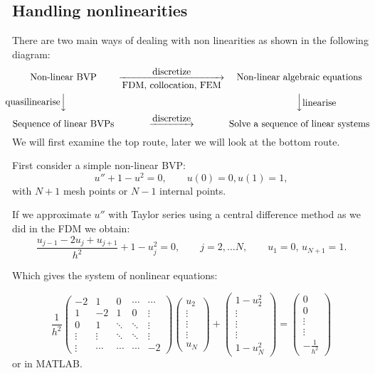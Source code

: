 \documentclass[12pt, a4paper]{article}
\theoremstyle{definition}
\theoremstyle{remark}
\numberwithin{equation}{section}
\begin{document}
\subsection{Handling nonlinearities}
There are two main ways of dealing with non linearities as shown in the following diagram:
\begin{equation*}
\begin{CD}
\mbox{Non-linear BVP} @>\mbox{discretize}>\mbox{FDM, collocation, FEM}> \mbox{Non-linear algebraic equations}\\
@V\mbox{quasilinearise}VV @VV\mbox{linearise}V\\
\mbox{Sequence of linear BVPs} @>\mbox{discretize}>> \mbox{Solve a sequence of linear systems}
\end{CD}
\end{equation*}
We will first examine the top route, later we will look at the bottom route.

First consider a simple non-linear BVP:
\begin{equation*}
u''+1-u^2=0, \qquad u(0)=0, u(1)=1,
\end{equation*}
with $N+1$ mesh points or $N-1$ internal points.

If we approximate $u''$ with Taylor series using a central difference method as we did in the FDM we obtain:
\begin{equation*}
\frac{u_{j-1}-2u_j+u_{j+1}}{h^2} +1-u^2_j=0, \qquad j=2,\dots N, \qquad u_1=0,\,u_{N+1}=1.
\end{equation*}

Which gives the system of nonlinear equations:

\begin{equation*}
\frac{1}{h^2} 
\begin{pmatrix}
-2 & 1 & 0 & \cdots & \cdots \\
1 & -2 & 1 & 0 & \vdots \\
0 & 1& \ddots & \ddots & \vdots\\
\vdots & \vdots & \ddots & \ddots & \vdots\\
\vdots & \cdots &\cdots &\cdots &-2
\end{pmatrix}
\begin{pmatrix}
u_2 \\
\vdots\\
\vdots\\
\vdots\\
u_N
\end{pmatrix}
+
\begin{pmatrix}
1-u_2^2 \\
\vdots\\
\vdots\\
\vdots\\
1-u_N^2
\end{pmatrix}
=
\begin{pmatrix}
0 \\
0\\
\vdots\\
\vdots\\
-\frac{1}{h^2}
\end{pmatrix}
\end{equation*}
or  in MATLAB. 
\end{document}
